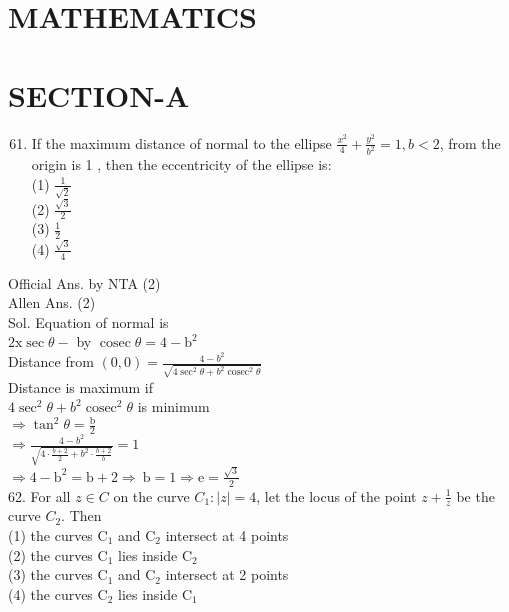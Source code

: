 \documentclass[10pt]{article}
\begin{document}
\captionsetup{singlelinecheck=false}
\section*{MATHEMATICS}
\section*{SECTION-A}
\begin{enumerate}
  \setcounter{enumi}{60}
  \item If the maximum distance of normal to the ellipse \(\frac{x^{2}}{4}+\frac{y^{2}}{b^{2}}=1, b<2\), from the origin is 1 , then the eccentricity of the ellipse is:\\
(1) \(\frac{1}{\sqrt{2}}\)\\
(2) \(\frac{\sqrt{3}}{2}\)\\
(3) \(\frac{1}{2}\)\\
(4) \(\frac{\sqrt{3}}{4}\)
\end{enumerate}

Official Ans. by NTA (2)\\
Allen Ans. (2)\\
Sol. Equation of normal is\\
\(2 \mathrm{x} \sec \theta-\) by \(\operatorname{cosec} \theta=4-\mathrm{b}^{2}\)\\
Distance from \((0,0)=\frac{4-b^{2}}{\sqrt{4 \sec ^{2} \theta+b^{2} \operatorname{cosec}^{2} \theta}}\)\\
Distance is maximum if\\
\(4 \sec ^{2} \theta+b^{2} \operatorname{cosec}^{2} \theta\) is minimum\\
\(\Rightarrow \tan ^{2} \theta=\frac{\mathrm{b}}{2}\)\\
\(\Rightarrow \frac{4-b^{2}}{\sqrt{4 \cdot \frac{b+2}{2}+b^{2} \cdot \frac{b+2}{b}}}=1\)\\
\(\Rightarrow 4-\mathrm{b}^{2}=\mathrm{b}+2 \Rightarrow \mathrm{~b}=1 \Rightarrow \mathrm{e}=\frac{\sqrt{3}}{2}\)\\
62. For all \(z \in C\) on the curve \(C_{1}:|z|=4\), let the locus of the point \(z+\frac{1}{z}\) be the curve \(C_{2}\). Then\\
(1) the curves \(\mathrm{C}_{1}\) and \(\mathrm{C}_{2}\) intersect at 4 points\\
(2) the curves \(\mathrm{C}_{1}\) lies inside \(\mathrm{C}_{2}\)\\
(3) the curves \(\mathrm{C}_{1}\) and \(\mathrm{C}_{2}\) intersect at 2 points\\
(4) the curves \(\mathrm{C}_{2}\) lies inside \(\mathrm{C}_{1}\)
\end{document}
